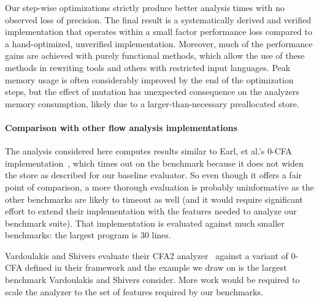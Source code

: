 \documentclass[9pt]{sigplanconf} %
\begin{document}
Our step-wise optimizations strictly produce better analysis times with no observed loss of precision.
%
The final result is a systematically derived and verified implementation that operates within a small factor performance loss compared to a hand-optimized, unverified implementation.
%
Moreover, much of the performance gains are achieved with purely functional methods, which allow the use of these methods in rewriting tools and others with restricted input languages.
%
Peak memory usage is often considerably improved by the end of the optimization steps, but the effect of mutation has unexpected consequence on the analyzers memory consumption, likely due to a larger-than-necessary preallocated store.

\paragraph{Comparison with other flow analysis implementations}

The analysis considered here computes results similar to Earl, et al.'s 0-CFA implementation~\cite{dvanhorn:Earl2012Introspective}, which times out on the \Church{} benchmark because it does not widen the store as described for our baseline evaluator.
%
So even though it offers a fair point of comparison, a more thorough evaluation is probably uninformative as the other benchmarks are likely to timeout as well (and it would require significant effort to extend their implementation with the features needed to analyze our benchmark suite).
%
That implementation is evaluated against much smaller benchmarks: the largest program is 30 lines.

Vardoulakis and Shivers evaluate their CFA2 analyzer~\cite{dvanhorn:Vardoulakis2011CFA2} against a variant of 0-CFA defined in their framework and the example we draw on is the largest benchmark Vardoulakis and Shivers consider.
%
More work would be required to scale the analyzer to the set of features required by our benchmarks.
\end{document}
